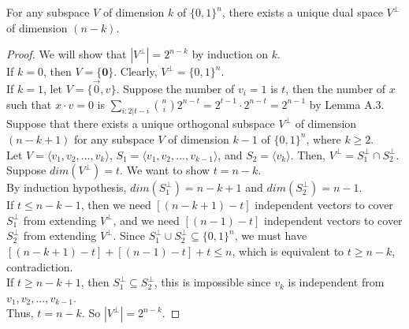 \begin{theorem} For any subspace $V$ of dimension $k$ of $\{ 0,1 \}^n$, 
there exists a unique dual space $V^\perp$ of dimension $(n-k)$.
\end{theorem}

\begin{proof}
We will show that $|V^\perp| = 2^{n-k}$ by induction on $k$.\\
If $k=0$, then $V = \{ \textbf{0}\}$. Clearly, $V^\perp = \{ 0, 1 \}^n$. \\
If $k=1$, let $V = \{ \vec{0}, v \}$. 
Suppose the number of $v_i = 1$ is $t$, 
then the number of $x$ such that $x \cdot v = 0$ is 
$\sum \limits_{i: 2|t-i} {n \choose i} 2^{n-t} =
2^{t-1} \cdot 2^{n-t} = 2^{n-1}$ by Lemma A.3. \\
Suppose that there exists a unique orthogonal subspace $V^\perp$ 
of dimension $(n-k+1)$ for any subspace $V$ of dimension $k-1$ of $\{ 0,1 \}^n$, where $k \geq 2$. \\
Let $V=\langle v_1, v_2,..., v_{k} \rangle$, 
$S_1 = \langle v_1, v_2,..., v_{k-1}\rangle$, 
and $S_2 = \langle v_{k}\rangle$.  Then, $V^\perp = S_1^\perp \cap S_2^\perp$. \\
Suppose $dim(V^\perp) = t$. We want to show $t = n-k$.\\
By induction hypothesis, $dim(S_1^\perp) = n-k+1$ 
and $dim(S_2^\perp) = n-1$. \\
If $t \leq n-k-1$, then we need $[(n-k+1) - t]$ independent vectors to cover $S_1^\perp$ from extending $V^\perp$, and we need $[(n-1) -t]$ independent vectors to cover $S_2^\perp$ from extending $V^\perp$. Since $S_1^\perp \cup S_2^\perp \subseteq \{ 0,1\}^n$, we must have $[(n-k+1) - t] + [(n-1) -t] + t \leq n$, which is equivalent to $t \geq n-k$, contradiction.\\
If $t \geq n-k+1$, then $S_1^\perp \subseteq S_2^\perp$,
this is impossible since $v_k$ is independent from $v_1, v_2, ..., v_{k-1}$. \\
Thus, $t = n-k$. So $|V^\perp| = 2^{n-k}$. 
\end{proof}

